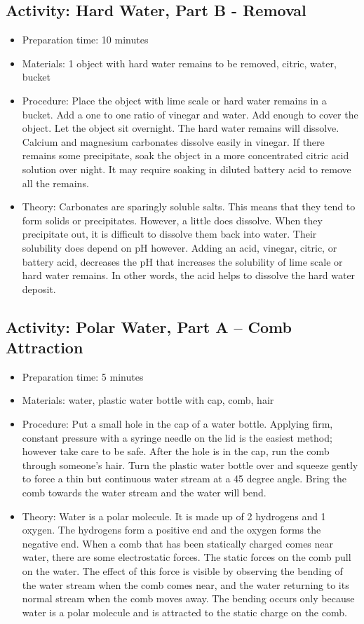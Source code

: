 \begin{itemize}
{\begin{itemize}
\begin{itemize}
{\subsection{Activity: Hard Water, Part B - Removal}
\begin{itemize}
\item{Preparation time: 10 minutes}
\item{Materials: 1 object with hard water remains to be removed, citric, water, bucket}
\item{Procedure: Place the object with lime scale or hard water remains in a bucket. Add a one to one ratio of vinegar and water. Add enough to cover the object. Let the object sit overnight. The hard water remains will dissolve. Calcium and magnesium carbonates dissolve easily in vinegar. If there remains some precipitate, soak the object in a more concentrated citric acid solution over night. It may require soaking in diluted battery acid to remove all the remains.}
\item{Theory: Carbonates are sparingly soluble salts. This means that they tend to form solids or precipitates. However, a little does dissolve. When they precipitate out, it is difficult to dissolve them back into water. Their solubility does depend on pH however. Adding an acid, vinegar, citric, or battery acid, decreases the pH that increases the solubility of lime scale or hard water remains. In other words, the acid helps to dissolve the hard water deposit.}
\end{itemize}

\subsection{Activity: Polar Water, Part A – Comb Attraction}
\begin{itemize}
\item{Preparation time: 5 minutes}
\item{Materials: water, plastic water bottle with cap, comb, hair}
\item{Procedure: Put a small hole in the cap of a water bottle. Applying firm, constant pressure with a syringe needle on the lid is the easiest method; however take care to be safe. After the hole is in the cap, run the comb through someone’s hair. Turn the plastic water bottle over and squeeze gently to force a thin but continuous water stream at a 45 degree angle. Bring the comb towards the water stream and the water will bend.}
\item{Theory: Water is a polar molecule. It is made up of 2 hydrogens and 1 oxygen. The hydrogens form a positive end and the oxygen forms the negative end. When a comb that has been statically charged comes near water, there are some electrostatic forces. The static forces on the comb pull on the water. The effect of this force is visible by observing the bending of the water stream when the comb comes near, and the water returning to its normal stream when the comb moves away. The bending occurs only because water is a polar molecule and is attracted to the static charge on the comb.}
\end{itemize}

}
\end{itemize}
\end{itemize}}
\end{itemize}
